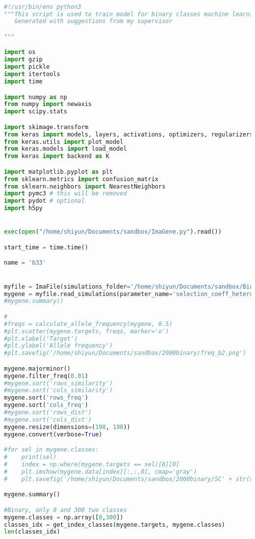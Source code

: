\begin{lstlisting}[language=Python,breaklines]

#!/usr/bin/env python3
"""This script is used to train model for binary classes machine learning
   Generated with suggestions from my supervisor

"""

import os
import gzip
import pickle
import itertools
import time

import numpy as np
from numpy import newaxis 
import scipy.stats

import skimage.transform
from keras import models, layers, activations, optimizers, regularizers
from keras.utils import plot_model
from keras.models import load_model
from keras import backend as K

import matplotlib.pyplot as plt
from sklearn.metrics import confusion_matrix
from sklearn.neighbors import NearestNeighbors
import pymc3 # this will be removed
import pydot # optional
import h5py 


exec(open("/home/shiyun/Documents/sandbox/ImaGene.py").read())

start_time = time.time()

name = 'b33'


myfile = ImaFile(simulations_folder='/home/shiyun/Documents/sandbox/Binary3/Simulations1.Epoch3',nr_samples=198, model_name='3epoch-CEU') 
mygene = myfile.read_simulations(parameter_name='selection_coeff_hetero', max_nrepl=2000)
#mygene.summary()

#
#freqs = calculate_allele_frequency(mygene, 0.5)
#plt.scatter(mygene.targets, freqs, marker='o')
#plt.xlabel('Target')
#plt.ylabel('Allele frequency')
#plt.savefig('/home/shiyun/Documents/sandbox/2000binary/freq_b2.png')

mygene.majorminor()
mygene.filter_freq(0.01)
#mygene.sort('rows_similarity')
#mygene.sort('cols_similarity')
mygene.sort('rows_freq')
mygene.sort('cols_freq')
#mygene.sort('rows_dist')
#mygene.sort('cols_dist')
mygene.resize(dimensions=(198, 198))
mygene.convert(verbose=True)

#for sel in mygene.classes:
#    print(sel)
#    index = np.where(mygene.targets == sel)[0][0]
#    plt.imshow(mygene.data[index][:,:,0], cmap='gray')
#    plt.savefig('/home/shiyun/Documents/sandbox/2000binary/SC' + str(sel) + '.png')

mygene.summary()

#Binary, only 0 and 300 two classes
mygene.classes = np.array([0,300])
classes_idx = get_index_classes(mygene.targets, mygene.classes)
len(classes_idx)


\end{lstlisting}
